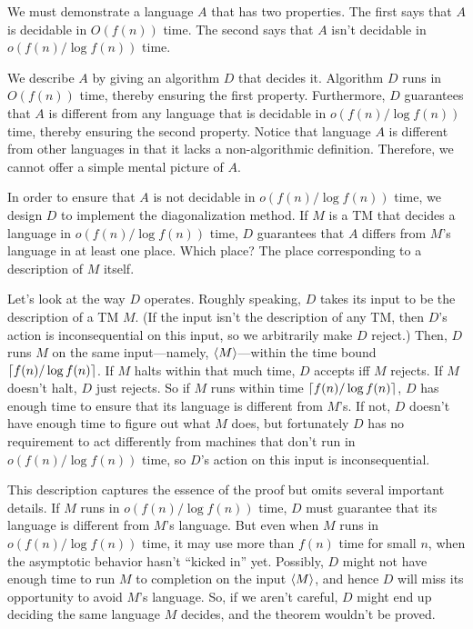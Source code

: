 \documentclass[11pt,twoside=off,numbers=noenddot]{scrbook}
\begin{document}
\begin{proofidea}
  We must demonstrate a language $A$ that has two properties. The first says that $A$ is decidable in $O(f(n))$ time. The second says that $A$ isn't decidable in $o(f(n) / \log f(n))$ time.

  We describe $A$ by giving an algorithm $D$ that decides it. Algorithm $D$ runs in $O(f(n))$ time, thereby ensuring the first property. Furthermore, $D$ guarantees that $A$ is different from any language that is decidable in $o(f(n) / \log f(n))$ time, thereby ensuring the second property. Notice that language $A$ is different from other languages in that it lacks a non-algorithmic definition. Therefore, we cannot offer a simple mental picture of $A$.

  In order to ensure that $A$ is not decidable in $o(f(n) / \log f(n))$ time, we design $D$ to implement the diagonalization method. If $M$ is a TM that decides a language in $o(f(n) / \log f(n))$ time, $D$ guarantees that $A$ differs from $M$'s language in at least one place. Which place? The place corresponding to a description of $M$ itself.

  Let's look at the way $D$ operates. Roughly speaking, $D$ takes its input to be the description of a TM $M$. (If the input isn't the description of any TM, then $D$'s action is inconsequential on this input, so we arbitrarily make $D$ reject.) Then, $D$ runs $M$ on the same input—namely, $\left< M \right>$—within the time bound $\lceil f(n) / \log f(n) \rceil$. If $M$ halts within that much time, $D$ accepts iff $M$ rejects. If $M$ doesn't halt, $D$ just rejects. So if $M$ runs within time $\lceil f(n) / \log f(n) \rceil$, $D$ has enough time to ensure that its language is different from $M$'s. If not, $D$ doesn't have enough time to figure out what $M$ does, but fortunately $D$ has no requirement to act differently from machines that don't run in $o(f(n) / \log f(n))$ time, so $D$'s action on this input is inconsequential.

  This description captures the essence of the proof but omits several important details. If $M$ runs in $o(f(n) / \log f(n))$ time, $D$ must guarantee that its language is different from $M$'s language. But even when $M$ runs in $o(f(n) / \log f(n))$ time, it may use more than $f(n)$ time for small $n$, when the asymptotic behavior hasn't ``kicked in'' yet. Possibly, $D$ might not have enough time to run $M$ to completion on the input $\left< M \right>$, and hence $D$ will miss its opportunity to avoid $M$'s language. So, if we aren't careful, $D$ might end up deciding the same language $M$ decides, and the theorem wouldn't be proved.


\end{proofidea}
\end{document}
